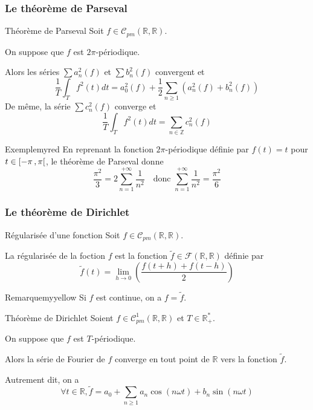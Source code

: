     \subsubsection{Le théorème de Parseval}

    \begin{theo}{Théorème de Parseval}{}
        Soit $f \in \mathcal{C}_{pm}(\mathbb{R},\mathbb{R})$.

        On suppose que $f$ est $2 \pi$-périodique.

        Alors les séries $\sum a_n^2 (f)$ et $\sum b_n^2 (f)$ convergent et 
        \[ \frac{1}{T} \int_{T} f^2(t) dt = a_0^2(f) + \frac{1}{2} \sum\limits_{n \geq 1} \left(a_n^2(f) + b_n^2(f)\right) \]
        De même, la série $\sum c_n^2(f)$ converge et 
        \[ \frac{1}{T} \int_{T} f^2(t) dt = \sum\limits_{n \in \mathbb{Z}} c_n^2(f) \]
    \end{theo}

    \begin{omed}{Exemple}{myred}
        En reprenant la fonction $2\pi$-périodique définie par $f(t) = t$ pour $t \in \left[ -\pi \, , \pi \right[$, le théorème de Parseval donne 
        \[ \frac{\pi^2}{3} = 2 \sum\limits_{n=1}^{+\infty} \frac{1}{n^2} \quad \text{donc } \sum\limits_{n=1}^{+\infty} \frac{1}{n^2} = \frac{\pi^2}{6} \]
    \end{omed}

    \subsubsection{Le théorème de Dirichlet}

    \begin{defi}{Régularisée d’une fonction}{}
        Soit $f \in \mathcal{C}_{pm}(\mathbb{R},\mathbb{R})$.
    
        La régularisée de la foction $f$ est la fonction $\tilde{f} \in \mathcal{F}(\mathbb{R},\mathbb{R})$ définie par 
        \[ \tilde{f}(t) = \lim\limits_{h \rightarrow 0} \left(\frac{f(t+h) + f(t-h)}{2}\right) \]
    \end{defi}

    \begin{omed}{Remarque}{myyellow}
        Si $f$ est continue, on a $f = \tilde{f}$.
    \end{omed}

    \begin{theo}{Théorème de Dirichlet}{}
        Soient $f \in \mathcal{C}^1_{pm}(\mathbb{R},\mathbb{R})$ et $T \in \mathbb{R}^*_+$.

        On suppose que $f$ est $T$-périodique.

        Alors la série de Fourier de $f$ converge en tout point de $\mathbb{R}$ vers la fonction $\tilde{f}$. 
        
        Autrement dit, on a 
        \[ \forall t \in \mathbb{R}, \tilde{f} = a_0 + \sum\limits_{n \geq 1} a_n \cos(n \omega t) + b_n \sin(n \omega t) \]
    \end{theo}


